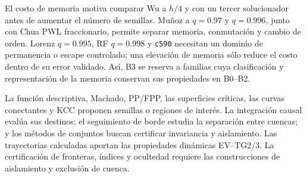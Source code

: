 El costo de memoria motiva comparar Wu a \(h/4\) y con un tercer
solucionador antes de aumentar el número de semillas. Muñoz a \(q=0.97\)
y \(q=0.996\), junto con Chua PWL fraccionario, permite separar memoria,
conmutación y cambio de orden. Lorenz \(q=0.995\), RF \(q=0.998\) y
\texttt{c590} necesitan un dominio de permanencia o escape controlado; una
elevación de memoria sólo reduce el costo dentro de su error validado.
Así, B3 se reserva a familias cuya clasificación y representación de la
memoria conservan sus propiedades en B0--B2.

La función descriptiva, Machado, PP/FPP, las superficies críticas, las curvas
conectantes y KCC proponen semillas o regiones de interés. La integración
causal evalúa sus destinos; el seguimiento de borde estudia la separación
entre cuencas; y los métodos de conjuntos buscan certificar invariancia y
aislamiento. Las trayectorias calculadas aportan las propiedades dinámicas EV--TG2/3. La
certificación de fronteras, índices y ocultedad requiere las
construcciones de aislamiento y exclusión de cuenca.
